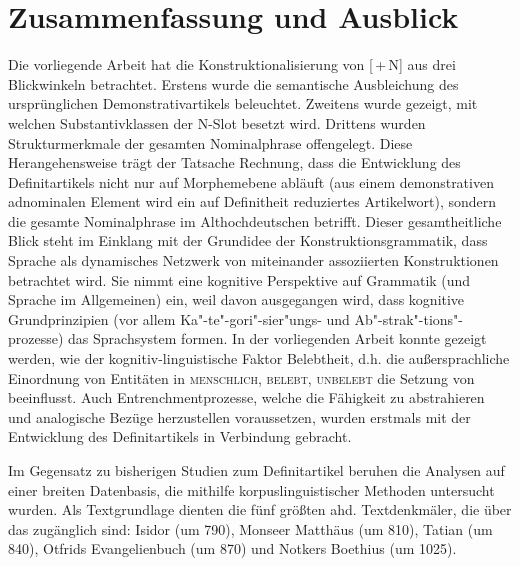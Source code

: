\chapter{Zusammenfassung und Ausblick}\label{kapitel:zusammenfassung}

Die vorliegende Arbeit hat die Konstruktionalisierung von [\,+\,N] aus drei Blickwinkeln betrachtet. Erstens wurde die semantische Ausbleichung des ursprünglichen Demonstrativartikels beleuchtet. Zweitens wurde gezeigt, mit welchen Substantivklassen der N-Slot besetzt wird. Drittens wurden Strukturmerkmale der gesamten Nominalphrase offengelegt. 
Diese Herangehensweise trägt der Tatsache Rechnung, dass die Entwicklung des Definitartikels nicht nur auf Morphemebene abläuft (aus einem demonstrativen adnominalen Element wird ein auf Definitheit reduziertes Artikelwort), sondern die gesamte Nominalphrase im Althochdeutschen betrifft. Dieser gesamtheitliche Blick steht im Einklang mit der Grundidee der Konstruktionsgrammatik, dass Sprache als dynamisches Netzwerk von miteinander assoziierten Konstruktionen betrachtet wird. Sie nimmt eine kognitive Perspektive auf Grammatik (und Sprache im Allgemeinen) ein, weil davon ausgegangen wird, dass kognitive Grundprinzipien (vor allem Ka"-te"-gori"-sier"ungs- und Ab"-strak"-tions"-prozesse) das Sprachsystem formen. In der vorliegenden Arbeit konnte gezeigt werden, wie der kognitiv-linguistische Faktor Belebtheit, d.h. die außersprachliche Einordnung von Entitäten in \textsc{menschlich, belebt, unbelebt} die Setzung von  beeinflusst. Auch Entrenchmentprozesse, welche die Fähigkeit zu abstrahieren und analogische Bezüge herzustellen voraussetzen, wurden erstmals mit der Entwicklung des Definitartikels in Verbindung gebracht.

Im Gegensatz zu bisherigen Studien zum Definitartikel beruhen die Analysen auf einer breiten Datenbasis, die mithilfe korpuslinguistischer Methoden untersucht wurden. Als Textgrundlage dienten die fünf größten ahd. Textdenkmäler, die über das  zugänglich sind: Isidor (um 790), Monseer Matthäus (um 810), Tatian (um 840), Otfrids Evangelienbuch (um 870) und Notkers Boethius (um 1025). 

